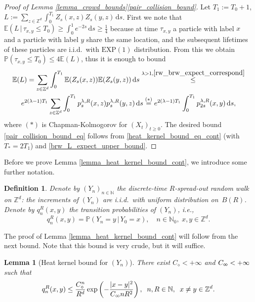 \documentclass[a4paper,12pt]{article}
\newtheorem  {lemma}         [theorem]{Lemma}
\newtheorem  {definition}    [theorem]{Definition}
\newcommand{\ddiamond}{\diamond \hspace{-.05cm} \diamond}
\begin{document}
\begin{proof}[Proof of Lemma \ref{lemma_crowd_bounds}\eqref{pair_collision_bound}]
Let $T_1:=T_0+1$, $L:= \sum_{z \in \mathbb{Z}^d} \int_0^{T_1} Z_s(x,z)Z_s(y,z) \, \mathrm{d}s$. First we note that
$\mathbb{E}(L \, | \, \tau_{x,y} \leq T_0 ) \geq \int_0^1 e^{-2s} \, \mathrm{d}s \geq \frac{1}{4}$ because at time $\tau_{x,y}$ a particle
with label $x$ and a particle with label $y$ share the same location, and the subsequent lifetimes of these particles  are
i.i.d.\ with $\mathrm{EXP}(1)$ distribution. From this we obtain
$\mathbb{P}(\tau_{x,y} \leq T_0 )\leq 4 \mathbb{E}(L)$, thus it is enough to bound
\begin{multline}\label{brw_L_expect_upper_bound}
  \mathbb{E}(L)=\sum_{z \in \mathbb{Z}^d} \int_0^{T_1} \mathbb{E}(Z_s(x,z))\mathbb{E}(Z_s(y,z)) \, \mathrm{d}s \stackrel{ \lambda>1, \eqref{rw_brw_expect_correspond} }{\leq} \\
  e^{2(\lambda-1)T_1} \sum_{z \in \mathbb{Z}^d} \int_0^{T_1}  p^{\lambda,R}_{s}(x,z)  p^{\lambda,R}_{s}(y,z)   \, \mathrm{d}s\stackrel{(*)}{=}
  e^{2(\lambda-1)T_1} \int_0^{T_1}  p^{\lambda,R}_{2s}(x,y)   \, \mathrm{d}s,
\end{multline}
where  $(*)$ is Chapman-Kolmogorov for $(X_t)_{t\geq 0}$. The desired bound \eqref{pair_collision_bound_eq} follows from \eqref{heat_kernel_bound_eq_cont} (with $T_*=2T_1$) and \eqref{brw_L_expect_upper_bound}.
\end{proof}

Before we prove Lemma \ref{lemma_heat_kernel_bound_cont}, we introduce some further notation.

\begin{definition}\label{def_R_spread_out_discrete_rw}
 Denote by $(Y_n)_{n \in \mathbb{N}}$ the discrete-time $R$-spread-out random walk on $\mathbb{Z}^d$: the increments of $(Y_n)$ are i.i.d.\ with
 uniform distribution on~$B(R)$.
 Denote by $q_{n}^{R}(x,y)$ the transition probabilities of $(Y_n)$, i.e.,
  \begin{equation}\label{discr_time_tr_kernel}
  q_{n}^{R}(x,y)=\mathbb{P}(Y_{n}=y \, | \, Y_0=x ), \quad n \in \mathbb{N}_0, \; x,y \in \mathbb{Z}^d.
  \end{equation}
 \end{definition}

The proof of Lemma \ref{lemma_heat_kernel_bound_cont} will follow from the next bound. Note that this bound is very crude, but it will suffice.

\begin{lemma}[Heat kernel bound for $(Y_n)$]\label{lemma_transition_prob_bound}
  There exist $C_\diamond<+\infty$ and $C_{\ddiamond}<+\infty$ such that
\begin{equation}\label{heat_kernel_bound_eq_discrete}
  q_{n}^{R}(x,y) \leq   \frac{C_{\diamond}^n  }{R^{d}}  \exp\left(  -  \frac{|x-y|^2}{C_{\ddiamond}  n R^2 } \right), \; \; n,R \in \mathbb{N}, \; \;   x \neq y  \in \mathbb{Z}^d.
\end{equation}
\end{lemma}
\end{document}
